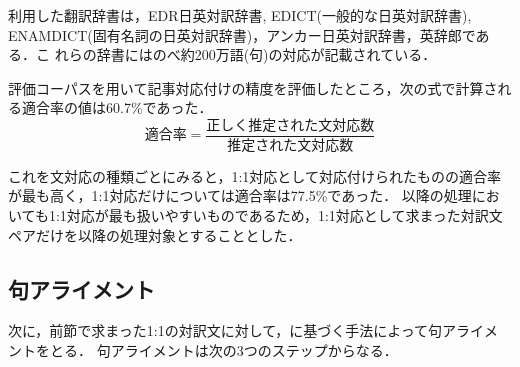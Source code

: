 \documentclass{nlp}
\begin{document}
利用した翻訳辞書は，EDR日英対訳辞書, EDICT(一般的な日英対訳辞書),
ENAMDICT(固有名詞の日英対訳辞書)，アンカー日英対訳辞書，英辞郎である．こ
れらの辞書にはのべ約200万語(句)の対応が記載されている．

評価コーパスを用いて記事対応付けの精度を評価したところ，次の式で計算され
る適合率の値は60.7\%であった．
\begin{equation}
\mbox{適合率} = \frac{\mbox{正しく推定された文対応数}}{\mbox{推定された文対応数}}
\end{equation}

これを文対応の種類ごとにみると，1:1対応として対応付けられたものの適合率が最も高く，1:1対応だけについては適合率は77.5\%であった．
以降の処理においても1:1対応が最も扱いやすいものであるため，1:1対応として求まった対訳文ペアだけを以降の処理対象とすることとした．

\subsection{句アライメント}

次に，前節で求まった1:1の対訳文に対して，\cite{Aramaki2001}に基づく手法によって句アライメントをとる．
句アライメントは次の3つのステップからなる．
\end{document}
